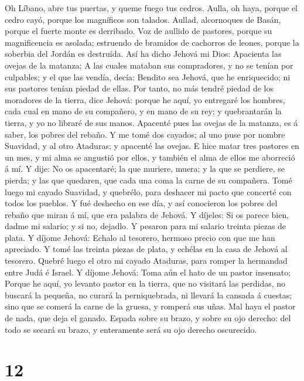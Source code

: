  Oh Líbano, abre tus puertas, y queme fuego tus cedros.
 Aulla, oh haya, porque el cedro cayó, porque los magníficos
son talados. Aullad, alcornoques de Basán, porque el fuerte monte es
derribado.  Voz de aullido de pastores, porque su
magnificencia es asolada; estruendo de bramidos de cachorros de leones,
porque la soberbia del Jordán es destruída.  Así ha dicho
Jehová mi Dios: Apacienta las ovejas de la matanza;  A las
cuales mataban sus compradores, y no se tenían por culpables; y el que
las vendía, decía: Bendito sea Jehová, que he enriquecido; ni sus
pastores tenían piedad de ellas.  Por tanto, no más tendré
piedad de los moradores de la tierra, dice Jehová: porque he aquí, yo
entregaré los hombres, cada cual en mano de su compañero, y en mano de
su rey; y quebrantarán la tierra, y yo no libraré de sus manos.
 Apacenté pues las ovejas de la matanza, es á saber, los
pobres del rebaño. Y me tomé dos cayados; al uno puse por nombre
Suavidad, y al otro Ataduras; y apacenté las ovejas.  E hice
matar tres pastores en un mes, y mi alma se angustió por ellos, y
también el alma de ellos me aborreció á mí.  Y dije: No os
apacentaré; la que muriere, muera; y la que se perdiere, se pierda; y
las que quedaren, que cada una coma la carne de su compañera.
 Tomé luego mi cayado Suavidad, y quebrélo, para deshacer
mi pacto que concerté con todos los pueblos.  Y fué
deshecho en ese día, y así conocieron los pobres del rebaño que miran á
mí, que era palabra de Jehová.  Y díjeles: Si os parece
bien, dadme mi salario; y si no, dejadlo. Y pesaron para mi salario
treinta piezas de plata.  Y díjome Jehová: Echalo al
tesorero, hermoso precio con que me han apreciado. Y tomé las treinta
piezas de plata, y echélas en la casa de Jehová al tesorero.
 Quebré luego el otro mi cayado Ataduras, para romper la
hermandad entre Judá é Israel.  Y díjome Jehová: Toma aún
el hato de un pastor insensato;  Porque he aquí, yo levanto
pastor en la tierra, que no visitará las perdidas, no buscará la
pequeña, no curará la perniquebrada, ni llevará la cansada á cuestas;
sino que se comerá la carne de la gruesa, y romperá sus uñas.
 Mal haya el pastor de nada, que deja el ganado. Espada
sobre su brazo, y sobre su ojo derecho: del todo se secará su brazo, y
enteramente será su ojo derecho oscurecido.

\hypertarget{section-11}{%
\section{12}\label{section-11}}

